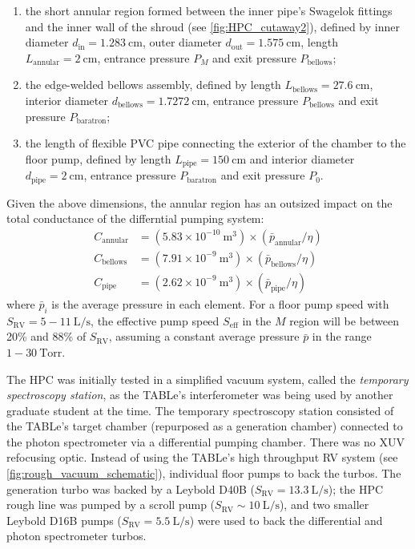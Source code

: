 \begin{enumerate}
	\item the short annular region formed between the inner pipe's Swagelok fittings and the inner wall of the shroud (see \cref{fig:HPC_cutaway2}), defined by inner diameter $d_{\textrm{in}} = 1.283 \ \textrm{cm}$, outer diameter $d_{\textrm{out}} = 1.575 \ \textrm{cm}$, length $L_{\textrm{annular}} = 2 \ \textrm{cm}$, entrance pressure $P_M$ and exit pressure $P_{\textrm{bellows}}$;
	\item the edge-welded bellows assembly, defined by length $L_{\textrm{bellows}} = 27.6 \ \textrm{cm}$, interior diameter $d_{\textrm{bellows}} = 1.7272 \ \textrm{cm}$, entrance pressure $P_{\textrm{bellows}}$ and exit pressure $P_{\textrm{baratron}}$;
	\item the length of flexible PVC pipe connecting the exterior of the chamber to the floor pump, defined by length $L_{\textrm{pipe}} = 150 \ \textrm{cm}$ and interior diameter $d_{\textrm{pipe}} = 2 \ \textrm{cm}$, entrance pressure $P_{\textrm{baratron}}$ and exit pressure $P_0$.
\end{enumerate}

Given the above dimensions, the annular region has an outsized impact on the total conductance of the differntial pumping system:
\begin{equation*}
\begin{aligned}
C_{\textrm{annular}} &= (5.83 \times 10^{-10} \ \textrm{m}^{3}) \times (\bar{p}_{\textrm{annular}}/\eta) \\
C_{\textrm{bellows}} &= (7.91 \times 10^{-9} \ \textrm{m}^{3}) \times (\bar{p}_{\textrm{bellows}}/\eta) \\
C_{\textrm{pipe}} &= (2.62 \times 10^{-9} \ \textrm{m}^{3}) \times (\bar{p}_{\textrm{pipe}}/\eta)
\end{aligned}
\end{equation*}
where $\bar{p}_i$ is the average pressure in each element. For a floor pump speed with ${S_{\textrm{RV}} = 5 - 11 \ \textrm{L/s}}$, the effective pump speed $S_{\textrm{eff}}$ in the $M$ region will be between 20\% and 88\% of $S_{\textrm{RV}}$, assuming a constant average pressure $\bar{p}$ in the range ${1 - 30 \ \textrm{Torr}}$.

The HPC was initially tested in a simplified vacuum system, called the \textit{temporary spectroscopy station}, as the TABLe's interferometer was being used by another graduate student at the time. The temporary spectroscopy station consisted of the TABLe's target chamber (repurposed as a generation chamber) connected to the photon spectrometer via a differential pumping chamber. There was no XUV refocusing optic. Instead of using the TABLe's high throughput RV system (see \cref{fig:rough_vacuum_schematic}), individual floor pumps to back the turbos. The generation turbo was backed by a Leybold D40B ($S_{\textrm{RV}} = 13.3 \ \textrm{L/s}$); the HPC rough line was pumped by a scroll pump ($S_{\textrm{RV}} \sim 10 \ \textrm{L/s}$), and two smaller Leybold D16B pumps ($S_{\textrm{RV}} = 5.5 \ \textrm{L/s}$) were used to back the differential and photon spectrometer turbos.

